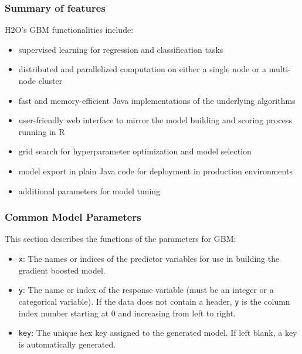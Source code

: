 \documentclass{article}[11pt]
\begin{document}
{\subsubsection{Summary of features} 
H2O's GBM functionalities include:

\begin{itemize}

\item supervised learning for regression and classification tasks

\item distributed and parallelized computation on either a single node or a multi-node cluster

\item fast and memory-efficient Java implementations of the underlying algorithms

\item user-friendly web interface to mirror the model building and scoring process running in R

\item grid search for hyperparameter optimization and model selection

\item model export in plain Java code for deployment in production environments

\item additional parameters for model tuning

\end{itemize}

\subsubsection{Common Model Parameters}

This section describes the functions of the parameters for GBM: 

\begin{itemize}

\item {\texttt{x}}: The names or indices of the predictor variables for use in building the gradient boosted model. 

\item {\texttt{y}}: The name or index of the response variable (must be an integer or a categorical variable). If the data does not contain a header, {\texttt{y}} is the column index number starting at 0 and increasing from left to right. 

\item {\texttt{key}}: The unique hex key assigned to the generated model. If left blank, a key is automatically generated. 


\end{itemize}}
\end{document}

